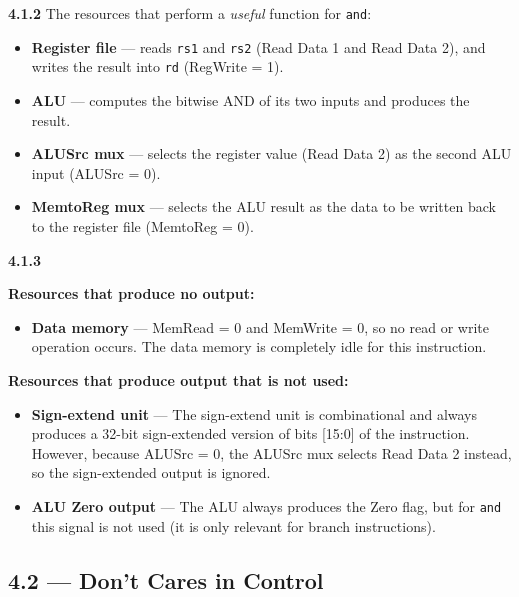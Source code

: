 \medskip\noindent\textbf{4.1.2}
The resources that perform a \emph{useful} function for \texttt{and}:

\begin{itemize}
  \item \textbf{Register file} --- reads \texttt{rs1} and \texttt{rs2}
        (Read Data 1 and Read Data 2), and writes the result into
        \texttt{rd} (RegWrite = 1).
  \item \textbf{ALU} --- computes the bitwise AND of its two inputs and
        produces the result.
  \item \textbf{ALUSrc mux} --- selects the register value
        (Read Data 2) as the second ALU input (ALUSrc = 0).
  \item \textbf{MemtoReg mux} --- selects the ALU result as the data
        to be written back to the register file (MemtoReg = 0).
\end{itemize}

\medskip\noindent\textbf{4.1.3}

\textbf{Resources that produce no output:}

\begin{itemize}
  \item \textbf{Data memory} --- MemRead = 0 and MemWrite = 0, so no
        read or write operation occurs.  The data memory is completely
        idle for this instruction.
\end{itemize}

\textbf{Resources that produce output that is not used:}

\begin{itemize}
  \item \textbf{Sign-extend unit} --- The sign-extend unit is
        combinational and always produces a 32-bit sign-extended version
        of bits [15:0] of the instruction.  However, because ALUSrc = 0,
        the ALUSrc mux selects Read Data 2 instead, so the sign-extended
        output is ignored.
  \item \textbf{ALU Zero output} --- The ALU always produces the Zero
        flag, but for \texttt{and} this signal is not used (it is only
        relevant for branch instructions).
\end{itemize}

\subsection*{4.2 --- Don't Cares in Control}
\hypertarget{sol-4.2}{}

